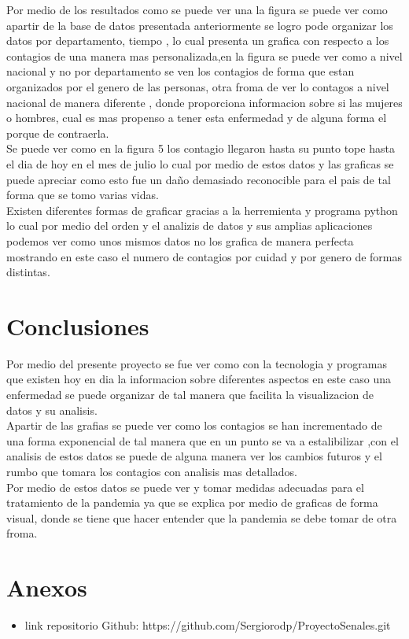 \documentclass[conference,compsoc,onecolumn]{IEEEtran}
\begin{document}
Por medio de los resultados como se puede ver una la figura 
se puede ver como apartir de la base de datos presentada anteriormente se logro pode organizar los datos por departamento, tiempo , lo cual presenta un grafica con respecto a los contagios de una manera mas personalizada,en la figura se puede ver como a nivel nacional y no por departamento se ven los contagios de forma que estan organizados por el genero de las personas, otra froma de ver lo contagos a nivel nacional de manera diferente , donde proporciona informacion sobre si las mujeres o hombres, cual es mas propenso a tener esta enfermedad y de alguna forma el porque de contraerla.\\ 

Se puede ver como en la figura 5 los contagio llegaron hasta su punto tope hasta el dia de hoy en el mes de julio lo cual por medio de estos datos y las graficas se puede apreciar como esto fue un daño demasiado reconocible para el pais de tal forma que se tomo varias vidas.\\

Existen diferentes formas de graficar gracias a la herremienta y programa python lo cual por medio del orden y el analizis de datos y sus amplias aplicaciones podemos ver como unos mismos datos no los grafica de manera perfecta mostrando en este caso el numero de contagios por cuidad y por genero de formas distintas.\\ 


\section{Conclusiones}
Por medio del presente proyecto se fue ver como con la tecnologia y programas que existen hoy en dia la informacion sobre diferentes aspectos en este caso una enfermedad se puede organizar de tal manera que facilita la visualizacion de datos y su analisis.\\ 

Apartir de las grafias se puede ver como los contagios se han incrementado de una forma exponencial de tal manera que en un punto se va a estalibilizar ,con el analisis de estos datos se puede de alguna manera ver los cambios futuros y el rumbo que tomara los contagios con analisis mas detallados.\\

Por medio de estos datos se puede ver y tomar medidas adecuadas para el tratamiento de la pandemia ya que se explica por medio de graficas de forma visual, donde se tiene que hacer entender que la pandemia se debe tomar de otra froma.


\label{sec:biblio}


\section{Anexos}
\begin{itemize}
    \item link repositorio Github: https://github.com/Sergiorodp/ProyectoSenales.git
\end{itemize}
\end{document}
